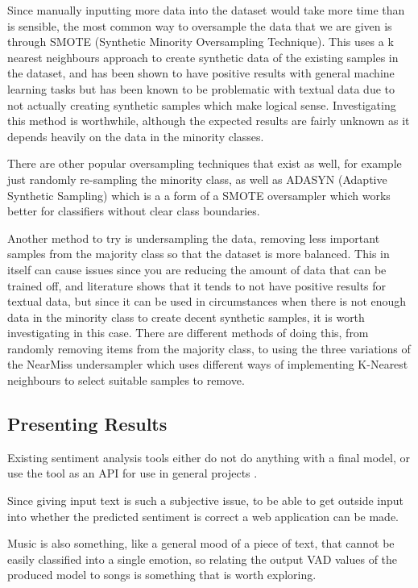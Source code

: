 Since manually inputting more data into the dataset would take more time than is sensible, the most common way to oversample the data that we are given is through SMOTE (Synthetic Minority Oversampling Technique). This uses a k nearest neighbours approach to create synthetic data of the existing samples in the dataset, and has been shown to have positive results with general machine learning tasks but has been known to be problematic with textual data due to not actually creating synthetic samples which make logical sense. Investigating this method is worthwhile, although the expected results are fairly unknown as it depends heavily on the data in the minority classes.

There are other popular oversampling techniques that exist as well, for example just randomly re-sampling the minority class, as well as ADASYN (Adaptive Synthetic Sampling) which is a a form of a SMOTE oversampler which works better for classifiers without clear class boundaries.

Another method to try is undersampling the data, removing less important samples from the majority class so that the dataset is more balanced. This in itself can cause issues since you are reducing the amount of data that can be trained off, and literature shows that it tends to not have positive results for textual data, but since it can be used in circumstances when there is not enough data in the minority class to create decent synthetic samples, it is worth investigating in this case. \cite{more2016survey} There are different methods of doing this, from randomly removing items from the majority class, to using the three variations of the NearMiss undersampler which uses different ways of implementing K-Nearest neighbours to select suitable samples to remove. 

\subsection{Presenting Results}

Existing sentiment analysis tools either do not do anything with a final model, or use the tool as an API for use in general projects \cite{sentimentAPI}.  

Since giving input text is such a subjective issue, to be able to get outside input into whether the predicted sentiment is correct a web application can be made. 

Music is also something, like a general mood of a piece of text, that cannot be easily classified into a single emotion, so relating the output VAD values of the produced model to songs is something that is worth exploring.

